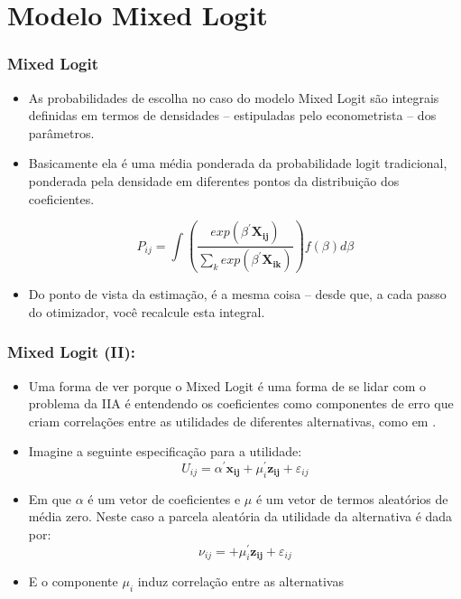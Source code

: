 \documentclass{beamer}
\begin{document}
\section{Modelo Mixed Logit}

\begin{frame}[fragile]\frametitle{Mixed Logit}

\begin{itemize}
	\item As probabilidades de escolha no caso do modelo Mixed Logit são integrais definidas em termos de densidades -- estipuladas pelo econometrista -- dos parâmetros.
	\item Basicamente ela é uma média ponderada da probabilidade logit tradicional, ponderada pela densidade em diferentes pontos da distribuição dos coeficientes.

	\[
	P_{ij}=\int \left( \frac{exp(\beta^{\prime} \mathbf{X_{ij}})}{\sum_{k} exp(\beta^{\prime} \mathbf{X_{ik}})}  \right) f(\beta) d\beta
	\]
	\item Do ponto de vista da estimação, é a mesma coisa -- desde que, a cada passo do otimizador, você recalcule esta integral.
\end{itemize}
\end{frame}


\begin{frame}[fragile]\frametitle{Mixed Logit (II):}
    
    \begin{itemize}
    	\item Uma forma de ver porque o Mixed Logit é uma forma de se lidar com o problema da IIA é entendendo os coeficientes como componentes de erro que criam correlações entre as utilidades de diferentes alternativas, como em \citet{Train2003f}.
    	\item Imagine a seguinte especificação para a utilidade:
    	\[
    	U_{ij}=\alpha^{\prime} \mathbf{x_{ij}} + \mu_{i}^{\prime} \mathbf{z_{ij}} + \varepsilon_{ij}
    	\]
    	\item Em que $\alpha$ é um vetor de coeficientes e $\mu$ é um vetor de termos aleatórios de média zero. Neste caso a parcela aleatória da utilidade da alternativa é dada por:
    	\[
    	\nu_{ij} = + \mu_{i}^{\prime} \mathbf{z_{ij}} + \varepsilon_{ij}
    	\]
    	\item E o componente $\mu_{i}$ induz correlação entre as alternativas
    \end{itemize}


\end{frame}

\begin{frame}[allowframebreaks]



\end{frame}

\end{document}
